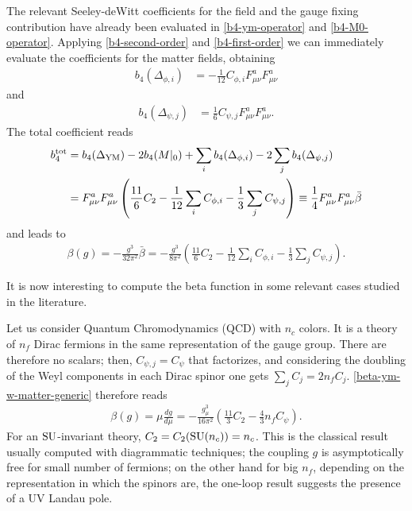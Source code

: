 The relevant Seeley-deWitt coefficients for the \ym{} field and the gauge fixing contribution have already been evaluated in \eqref{b4-ym-operator} and \eqref{b4-M0-operator}. 
Applying \eqref{b4-second-order} and \eqref{b4-first-order} we can immediately evaluate the coefficients for the matter fields, obtaining
\begin{align}\label{b4-scalar-usual-der}
b_4( \Delta_{\phi,i} ) & = - \frac{1 }{12}  C_{\phi,i} F^a_{\mu\nu} F^a_{\mu\nu}  
\end{align}
and
\begin{align}\label{b4-scalar-higher-der}
b_4( \Delta_{\psi,j} ) & = \frac{1}{6} C_{\psi,j} F_{\mu\nu}^a F_{\mu\nu}^a  .
\end{align}
The total coefficient reads
\begin{align}
b^{{ \text{tot} }}_4 & = 
	b_4( \Delta_{ \text{YM} } ) 
	- 2 b_4( M|_0 ) 
	+  \sum_i b_4( \Delta_{\phi,i} )
	- 2 \sum_j b_4( \Delta_{\psi,j} ) \\
& =
	F_{\mu\nu}^a F_{\mu\nu}^a  \left(
	\frac{11}{6} C_2 
	-   \frac{1 }{12} \sum_i C_{\phi,i}
	-   \frac{1}{3} \sum_j C_{\psi,j}
	\right)
\equiv \frac{1}{4} F_{\mu\nu}^a F_{\mu\nu}^a  \bar \beta
\end{align}
and leads to
\begin{align}\label{beta-ym-w-matter-generic}
\beta(g) 
= - \frac{g^3}{32 \pi^2} \bar \beta
= - \frac{g^3}{8 \pi^2} \left(
	\frac{11}{6} C_2 
	- \frac{1 }{12} \sum_i C_{\phi,i}
	- \frac{1}{3} \sum_j C_{\psi,j}
	\right).
\end{align}

It is now interesting to compute the beta function in some relevant cases studied in the literature.

Let us consider Quantum Chromodynamics (QCD) with $n_c$ colors. It is a theory of $n_f$ Dirac fermions in the same representation of the gauge group. There are therefore no scalars; then, $C_{\psi,j} = C_\psi$ that factorizes, and considering the doubling of the Weyl components in each Dirac spinor one gets $\sum_j C_j = 2 n_f C_j$. \eqref{beta-ym-w-matter-generic} therefore reads
\begin{align}
\beta(g) = \mu \frac{d g}{d	\mu} 
= - \frac{g_\mu^3}{16 \pi^2} \left(
	\frac{11}{3} C_2 
	-  \frac{4}{3} n_f C_{\psi}
	\right).
\end{align}
For an ${ \text{SU} }$-invariant theory, $C_2 = C_2({ \text{SU} }(n_c)) = n_c$.
This is the classical result usually computed with diagrammatic techniques; the coupling $g$ is asymptotically free for small number of fermions; on the other hand for big $n_f$, depending on the representation in which the spinors are, the one-loop result suggests the presence of a UV Landau pole.


